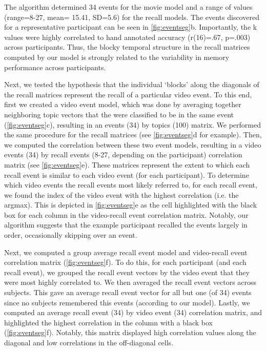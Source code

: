 \documentclass[a4paper,man,natbib,floatsintext]{apa6}
\begin{document}

The algorithm determined 34 events for the movie model and a range of values (range=8-27, mean= 15.41, SD=5.6) for the recall models.  The events discovered for a representative participant can be seen in \ref{fig:eventseg}b. Importantly, the k values were highly correlated to hand annotated accuracy (r(16)=.67, p=.003) across participants. Thus, the blocky temporal structure in the recall matrices computed by our model is strongly related to the variability in memory performance across participants.

Next, we tested the hypothesis that the individual `blocks' along the diagonals of the recall matrices represent the recall of a particular video event. To this end, first we created a video event model, which was done by averaging together neighboring topic vectors that the were classified to be in the same event (\ref{fig:eventseg}c), resulting in an events (34) by topics (100) matrix.  We performed the same procedure for the recall matrices (see \ref{fig:eventseg}d for example). Then, we computed the correlation between these two event models, resulting in a video events (34) by recall events (8-27, depending on the participant) correlation matrix (see \ref{fig:eventseg}e). These matrices represent the extent to which each recall event is similar to each video event (for each participant). To determine which video events the recall events most likely referred to, for each recall event, we found the index of the video event with the highest correlation (i.e. the argmax).  This is depicted in \ref{fig:eventseg}e as the cell highlighted with the black box for each column in the video-recall event correlation matrix. Notably, our algorithm suggests that the example participant recalled the events largely in order, occasionally skipping over an event.

Next, we computed a group average recall event model and video-recall event correlation matrix (\ref{fig:eventseg}f).  To do this, for each participant (and each recall event), we grouped the recall event vectors by the video event that they were most highly correlated to. We then averaged the recall event vectors across subjects. This gave an average recall event vector for all but one (of 34) events since no subjects remembered this events (according to our model). Lastly, we computed an average recall event (34) by video event (34) correlation matrix, and highlighted the highest correlation in the column with a black box (\ref{fig:eventseg}f). Notably, this matrix displayed high correlation values along the diagonal and low correlations in the off-diagonal cells.
\end{document}
